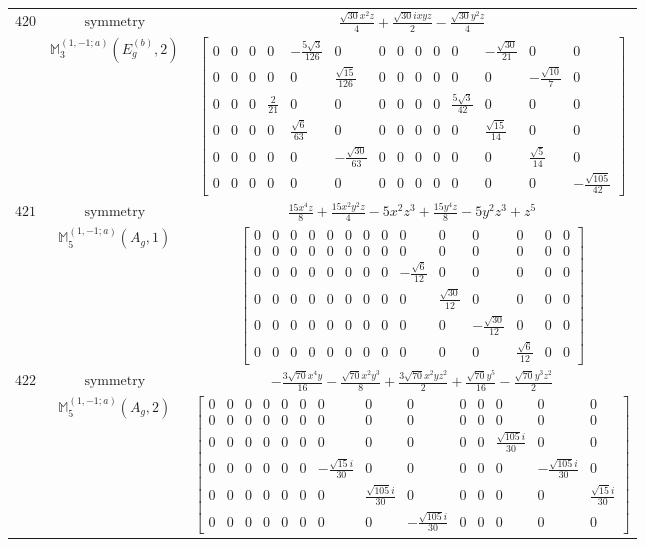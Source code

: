 \documentclass[fleqn,8pt,landscape]{jsarticle}
\begin{document}
\begin{longtable}{ccc}
$ 420 $ & $ \text{symmetry} $ & $ \frac{\sqrt{30} x^{2} z}{4} + \frac{\sqrt{30} i x y z}{2} - \frac{\sqrt{30} y^{2} z}{4} $ \\
$  $ & $ \mathbb{M}_{3}^{(1,-1;a)}(E_{g}^{(b)},2) $ & $ \begin{bmatrix} 0 & 0 & 0 & 0 & - \frac{5 \sqrt{3}}{126} & 0 & 0 & 0 & 0 & 0 & 0 & - \frac{\sqrt{30}}{21} & 0 & 0 \\ 0 & 0 & 0 & 0 & 0 & \frac{\sqrt{15}}{126} & 0 & 0 & 0 & 0 & 0 & 0 & - \frac{\sqrt{10}}{7} & 0 \\ 0 & 0 & 0 & \frac{2}{21} & 0 & 0 & 0 & 0 & 0 & 0 & \frac{5 \sqrt{3}}{42} & 0 & 0 & 0 \\ 0 & 0 & 0 & 0 & \frac{\sqrt{6}}{63} & 0 & 0 & 0 & 0 & 0 & 0 & \frac{\sqrt{15}}{14} & 0 & 0 \\ 0 & 0 & 0 & 0 & 0 & - \frac{\sqrt{30}}{63} & 0 & 0 & 0 & 0 & 0 & 0 & \frac{\sqrt{5}}{14} & 0 \\ 0 & 0 & 0 & 0 & 0 & 0 & 0 & 0 & 0 & 0 & 0 & 0 & 0 & - \frac{\sqrt{105}}{42} \end{bmatrix} $ \\ \hline
$ 421 $ & $ \text{symmetry} $ & $ \frac{15 x^{4} z}{8} + \frac{15 x^{2} y^{2} z}{4} - 5 x^{2} z^{3} + \frac{15 y^{4} z}{8} - 5 y^{2} z^{3} + z^{5} $ \\
$  $ & $ \mathbb{M}_{5}^{(1,-1;a)}(A_{g},1) $ & $ \begin{bmatrix} 0 & 0 & 0 & 0 & 0 & 0 & 0 & 0 & 0 & 0 & 0 & 0 & 0 & 0 \\ 0 & 0 & 0 & 0 & 0 & 0 & 0 & 0 & 0 & 0 & 0 & 0 & 0 & 0 \\ 0 & 0 & 0 & 0 & 0 & 0 & 0 & 0 & - \frac{\sqrt{6}}{12} & 0 & 0 & 0 & 0 & 0 \\ 0 & 0 & 0 & 0 & 0 & 0 & 0 & 0 & 0 & \frac{\sqrt{30}}{12} & 0 & 0 & 0 & 0 \\ 0 & 0 & 0 & 0 & 0 & 0 & 0 & 0 & 0 & 0 & - \frac{\sqrt{30}}{12} & 0 & 0 & 0 \\ 0 & 0 & 0 & 0 & 0 & 0 & 0 & 0 & 0 & 0 & 0 & \frac{\sqrt{6}}{12} & 0 & 0 \end{bmatrix} $ \\ \hline
$ 422 $ & $ \text{symmetry} $ & $ - \frac{3 \sqrt{70} x^{4} y}{16} - \frac{\sqrt{70} x^{2} y^{3}}{8} + \frac{3 \sqrt{70} x^{2} y z^{2}}{2} + \frac{\sqrt{70} y^{5}}{16} - \frac{\sqrt{70} y^{3} z^{2}}{2} $ \\
$  $ & $ \mathbb{M}_{5}^{(1,-1;a)}(A_{g},2) $ & $ \begin{bmatrix} 0 & 0 & 0 & 0 & 0 & 0 & 0 & 0 & 0 & 0 & 0 & 0 & 0 & 0 \\ 0 & 0 & 0 & 0 & 0 & 0 & 0 & 0 & 0 & 0 & 0 & 0 & 0 & 0 \\ 0 & 0 & 0 & 0 & 0 & 0 & 0 & 0 & 0 & 0 & 0 & \frac{\sqrt{105} i}{30} & 0 & 0 \\ 0 & 0 & 0 & 0 & 0 & 0 & - \frac{\sqrt{15} i}{30} & 0 & 0 & 0 & 0 & 0 & - \frac{\sqrt{105} i}{30} & 0 \\ 0 & 0 & 0 & 0 & 0 & 0 & 0 & \frac{\sqrt{105} i}{30} & 0 & 0 & 0 & 0 & 0 & \frac{\sqrt{15} i}{30} \\ 0 & 0 & 0 & 0 & 0 & 0 & 0 & 0 & - \frac{\sqrt{105} i}{30} & 0 & 0 & 0 & 0 & 0 \end{bmatrix} $ \\ \hline

\end{longtable}
\end{document}
